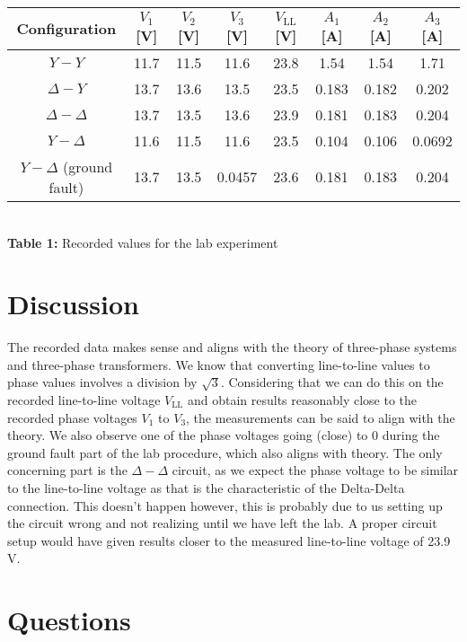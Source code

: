 \documentclass[]{report}
\begin{document}
\begin{table}[h]
	\centering
	\begin{tabular}{@{}c|ccccccc@{}}
		Configuration          			& $V_1$ [V]	& $V_2$ [V]	& $V_3$ [V]	&	$V_\text{LL}$ [V]	&	$A_1$ [A] 	& $A_2$ [A]		& $A_3$ [A]		\\ \midrule
		$Y-Y $                   		&  11.7  	&   11.5 	&   11.6 	&	23.8				&   1.54 		&   1.54		&   1.71 	 	\\
		$\Delta-Y$                  	&  13.7 	&   13.6 	&   13.5 	&   23.5				&	0.183		&   0.182		&   0.202 	 	\\
		$\Delta-\Delta$             	&  13.7 	&   13.5	&   13.6 	&  	23.9				& 	0.181 		&   0.183 		&   0.204	 	\\
		$Y-\Delta$                  	&  11.6  	&   11.5 	&   11.6 	&   23.5				&	0.104 		& 	0.106		&   0.0692 	 	\\
		$Y-\Delta$ (ground fault) 		&  13.7  	&   13.5 	&   0.0457 	&   23.6				&	0.181 		&   0.183 		&   0.204
	\end{tabular} \\ \vspace{1em}
	\textbf{Table 1:} Recorded values for the lab experiment
\end{table}

\section*{Discussion}

The recorded data makes sense and aligns with the theory of three-phase systems and three-phase transformers. We know that converting line-to-line values to phase values involves a division by $\sqrt{3}$. Considering that we can do this on the recorded line-to-line voltage $V_\text{LL}$ and obtain results reasonably close to the recorded phase voltages $V_1$ to $V_3$, the measurements can be said to align with the theory. We also observe one of the phase voltages going (close) to 0 during the ground fault part of the lab procedure, which also aligns with theory. The only concerning part is the $\Delta-\Delta$ circuit, as we expect the phase voltage to be similar to the line-to-line voltage as that is the characteristic of the Delta-Delta connection. This doesn't happen however, this is probably due to us setting up the circuit wrong and not realizing until we have left the lab. A proper circuit setup would have given results closer to the measured line-to-line voltage of 23.9 V.

\section*{Questions}
\end{document}

